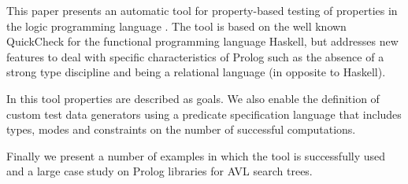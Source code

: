 
This paper presents an automatic tool for property-based testing of
properties in the logic programming language \Prolog{}.
%
The tool is based on the well known QuickCheck for the functional
programming language Haskell, but addresses new features to deal with
specific characteristics of Prolog such as the absence of a strong type
discipline and being a relational language (in opposite to Haskell).


In this tool properties are described as \Prolog{} goals.
%
We also enable the definition of custom test data generators using a
predicate specification language that includes types, modes and
constraints on the number of successful computations.

Finally we present a number of  examples in which the tool is
successfully used and a large case study on Prolog libraries for AVL
search trees.
